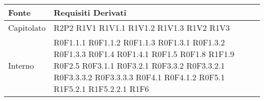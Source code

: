 	\begin{center}

	\def\arraystretch{1.5}
	\bgroup
	\begin{longtable}{| p{4cm} | p{4cm} |}

		\hline
		\textbf{Fonte} & \textbf{Requisiti Derivati} \\
		\hline

		Capitolato  &  R2P2 \newline R1V1 \newline R1V1.1 \newline R1V1.2 \newline R1V1.3 \newline R1V2 \newline R1V3 \\
		\hline
		Interno  &  R0F1.1.1 \newline R0F1.1.2 \newline R0F1.1.3 \newline R0F1.3.1 \newline R0F1.3.2 \newline R0F1.3.3 \newline R0F1.4 \newline R0F1.4.1 \newline R0F1.5 \newline R0F1.8 \newline R1F1.9 \newline R0F2.5 \newline R0F3.1.1 \newline R0F3.2.1 \newline R0F3.3.2 \newline R0F3.3.2.1 \newline R0F3.3.3.2 \newline R0F3.3.3.3 \newline R0F4.1 \newline R0F4.1.2 \newline R0F5.1 \newline R1F5.2.1 \newline R1F5.2.2.1 \newline R1F6 \newl
\end{longtable}
\end{center}
